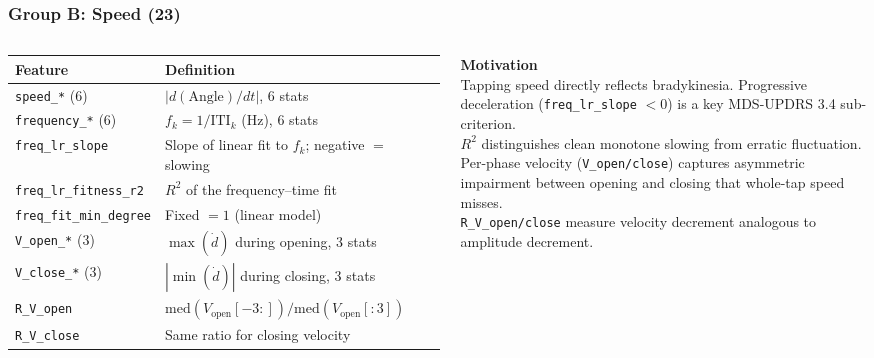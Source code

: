 \documentclass[aspectratio=169]{beamer}
\begin{document}
\begin{frame}
    \frametitle{Group B: Speed (23)}
    \scriptsize
    \begin{columns}[T]
        \renewcommand{\arraystretch}{1.2}
        \begin{tabular}{p{3.5cm}p{3.5cm}}
            \toprule
            \textbf{Feature} & \textbf{Definition} \\
            \midrule
            \texttt{speed\_*} (6) & $|d(\text{Angle})/dt|$, 6 stats \\
            \texttt{frequency\_*} (6) & $f_k = 1/\text{ITI}_k$ (Hz), 6 stats \\
            \texttt{freq\_lr\_slope} & Slope of linear fit to $f_k$; negative $=$ slowing \\
            \texttt{freq\_lr\_fitness\_r2} & $R^2$ of the frequency--time fit \\
            \texttt{freq\_fit\_min\_degree} & Fixed $= 1$ (linear model) \\
            \texttt{V\_open\_*} (3) & $\max(\dot{d})$ during opening, 3 stats \\
            \texttt{V\_close\_*} (3) & $|\min(\dot{d})|$ during closing, 3 stats \\
            \texttt{R\_V\_open} & $\mathrm{med}(V_\text{open}[-3:])/\mathrm{med}(V_\text{open}[:3])$ \\
            \texttt{R\_V\_close} & Same ratio for closing velocity \\
            \bottomrule
        \end{tabular}

        \textbf{Motivation}\\[0.3em]
        Tapping speed directly reflects bradykinesia. Progressive deceleration (\texttt{freq\_lr\_slope} $<0$) is a key MDS-UPDRS 3.4 sub-criterion.\\[0.4em]
        $R^2$ distinguishes clean monotone slowing from erratic fluctuation.\\[0.4em]
        Per-phase velocity (\texttt{V\_open/close}) captures asymmetric impairment between opening and closing that whole-tap speed misses.\\[0.4em]
        \texttt{R\_V\_open/close} measure velocity decrement analogous to amplitude decrement.
    \end{columns}
\end{frame}
\end{document}

